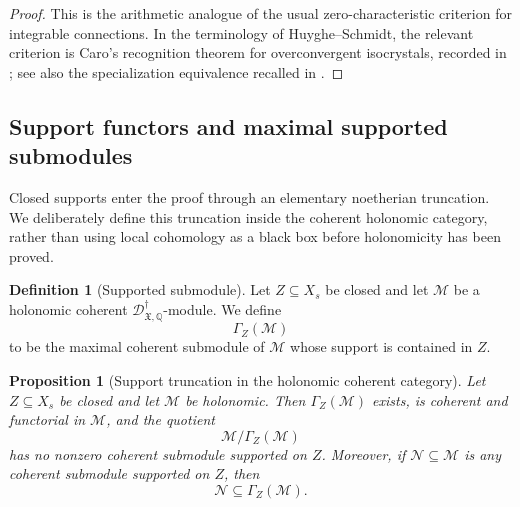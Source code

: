 \documentclass[11pt]{amsart}
\theoremstyle{plain}
\newtheorem{proposition}{Proposition}[section]
\theoremstyle{definition}
\newtheorem{definition}{Definition}[section]
\theoremstyle{remark}
\begin{document}
\begin{proof}
This is the arithmetic analogue of the usual zero-characteristic criterion for
integrable connections. In the terminology of Huyghe--Schmidt, the relevant
criterion is Caro's recognition theorem for overconvergent isocrystals,
recorded in \cite[Theorem 2.1.4]{HuygheSchmidtIntermediate}; see also the
specialization equivalence recalled in
\cite[Definition 2.1.3]{HuygheSchmidtIntermediate}.
\end{proof}

\subsection{Support functors and maximal supported submodules}
\label{subsec:support-functors}

Closed supports enter the proof through an elementary noetherian truncation.
We deliberately define this truncation inside the coherent holonomic category,
rather than using local cohomology as a black box before holonomicity has been
proved.

\begin{definition}[Supported submodule]
\label{def:supported-submodule}
Let \(Z\subseteq X_s\) be closed and let \(\mathcal M\) be a holonomic coherent
\(\mathscr D^\dagger_{\mathfrak X,\mathbb Q}\)-module.  We define
\[
  \Gamma_Z(\mathcal M)
\]
to be the maximal coherent submodule of \(\mathcal M\) whose support is contained
in \(Z\).
\end{definition}

\begin{proposition}[Support truncation in the holonomic coherent category]
\label{prop:support-truncation-standard}
Let \(Z\subseteq X_s\) be closed and let \(\mathcal M\) be holonomic.  Then
\(\Gamma_Z(\mathcal M)\) exists, is coherent and functorial in \(\mathcal M\),
and the quotient
\[
  \mathcal M/\Gamma_Z(\mathcal M)
\]
has no nonzero coherent submodule supported on \(Z\).  Moreover, if
\(\mathcal N\subseteq\mathcal M\) is any coherent submodule supported on \(Z\),
then
\[
  \mathcal N\subseteq \Gamma_Z(\mathcal M).
\]
\end{proposition}
\end{document}
